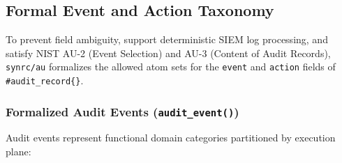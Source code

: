 \documentclass{article}
\begin{document}
\subsection{Formal Event and Action Taxonomy}

To prevent field ambiguity, support deterministic SIEM log processing, and satisfy NIST AU-2 (Event Selection) and AU-3 (Content of Audit Records), \texttt{synrc/au} formalizes the allowed atom sets for the \texttt{event} and \texttt{action} fields of \texttt{\#audit\_record\{\}}.

\subsubsection{Formalized Audit Events (\texttt{audit\_event()})}
Audit events represent functional domain categories partitioned by execution plane:
\end{document}
